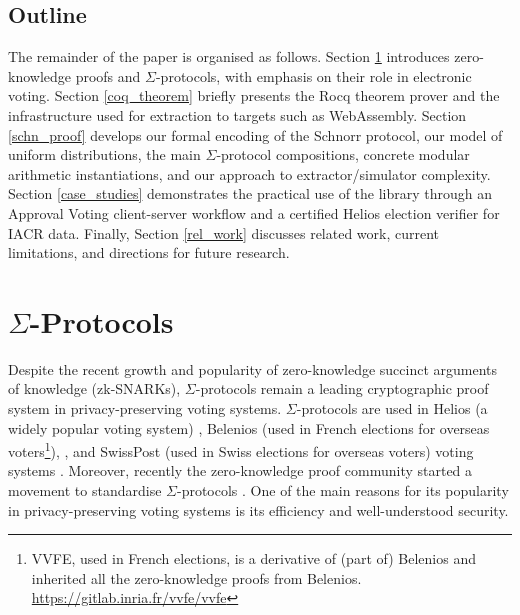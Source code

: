 \documentclass[sigconf, anonymous]{acmart}
\begin{document}
\subsection{Outline}
The remainder of the paper is organised as follows. 
Section \ref{sigma_protocol} introduces zero-knowledge proofs and $\Sigma$-protocols, with emphasis on their role in electronic voting. 
Section \ref{coq_theorem} briefly presents the Rocq theorem prover and the infrastructure used for extraction to targets such as WebAssembly. 
Section \ref{schn_proof} develops our formal encoding of the Schnorr protocol, our model of uniform distributions, the main $\Sigma$-protocol compositions, concrete modular arithmetic instantiations, and our approach to extractor/simulator complexity. 
Section \ref{case_studies} demonstrates the practical use of the library through an Approval Voting client-server workflow and a certified Helios election verifier for IACR data. Finally, Section \ref{rel_work} discusses related work, current limitations, and directions for future research.



\section{$\Sigma$-Protocols}\label{sigma_protocol}
Despite the recent growth and popularity of zero-knowledge succinct 
arguments of knowledge (zk-SNARKs), $\Sigma$-protocols remain a
leading cryptographic proof system in privacy-preserving voting systems. 
$\Sigma$-protocols are used in Helios (a widely popular voting system) \cite{adida2008helios}, 
Belenios (used in French elections for overseas 
voters\footnote{VVFE, used in French elections, is a derivative of (part of) Belenios and 
inherited all the zero-knowledge proofs from Belenios. \url{https://gitlab.inria.fr/vvfe/vvfe}}), \cite{cortier2023french}, and 
SwissPost (used in Swiss elections for overseas voters) voting 
systems \cite{10.1007/978-3-031-15911-4_4}. 
Moreover, recently the zero-knowledge proof community started a movement to standardise
$\Sigma$-protocols \cite{ZKProof}.
One of the main reasons for its popularity in privacy-preserving voting systems is its
efficiency and well-understood security.
\end{document}
